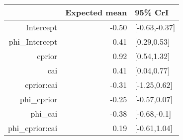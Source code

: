 \begin{tabular}{rrl}
  \hline
 & Expected mean & 95\% CrI \\ 
  \hline
Intercept & -0.50 & [-0.63,-0.37] \\ 
  phi\_Intercept & 0.41 & [0.29,0.53] \\ 
  cprior & 0.92 & [0.54,1.32] \\ 
  cai & 0.41 & [0.04,0.77] \\ 
  cprior:cai & -0.31 & [-1.25,0.62] \\ 
  phi\_cprior & -0.25 & [-0.57,0.07] \\ 
  phi\_cai & -0.38 & [-0.68,-0.1] \\ 
  phi\_cprior:cai & 0.19 & [-0.61,1.04] \\ 
   \hline
\end{tabular}

